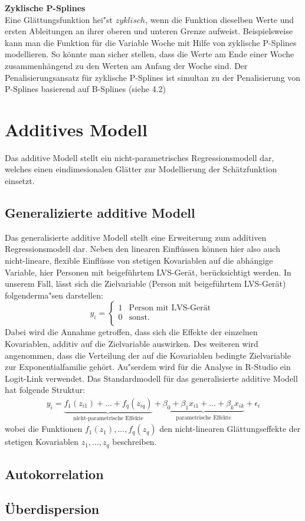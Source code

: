 \documentclass[12pt]{scrreprt}
\begin{document}
	\newpage
	\noindent\textbf{Zyklische P-Splines} \\
	Eine Glättungsfunktion hei"st $zyklisch$, wenn die Funktion dieselben Werte und ersten Ableitungen an ihrer oberen und unteren Grenze aufweist. Beispielsweise kann man die Funktion für die Variable Woche mit Hilfe von zyklische P-Splines modellieren. So könnte man sicher stellen, dass die Werte am Ende einer Woche zusammenhängend zu den Werten am Anfang der Woche sind. Der Penalisierungsansatz für zyklische P-Splines ist simultan zu der Penalisierung von P-Splines basierend auf B-Splines (siehe 4.2) 
	
	
	\section{Additives Modell}
	Das additive Modell stellt ein nicht-parametrisches Regressionsmodell dar, welches einen eindimesionalen Glätter zur Modellierung der Schätzfunktion einsetzt. 
	\subsection{Generalizierte additive Modell}
	Das generalisierte additive Modell stellt eine Erweiterung zum additiven Regressionsmodell dar.
	Neben den linearen Einﬂüssen können hier also auch nicht-lineare, flexible Einflüsse von stetigen Kovariablen auf die abhängige Variable, hier Personen mit beigeführtem LVS-Gerät, berücksichtigt werden. In unserem Fall, lässt sich die Zielvariable (Person mit beigeführtem LVS-Gerät) folgenderma"sen darstellen:
	\[y_{i}=\begin{cases}
	1 & \text{Person mit LVS-Gerät } \\
	0 & \text{sonst.} \\
	\end{cases}\]
	Dabei wird die Annahme getroffen, dass sich die Effekte der einzelnen Kovariablen, additiv auf die Zielvariable auswirken. Des weiteren wird angenommen, dass die Verteilung der auf die Kovariablen bedingte Zielvariable zur Exponentialfamilie gehört. Au"serdem wird für die Analyse in R-Studio ein Logit-Link verwendet.
	Das Standardmodell für das generalisierte additive Modell hat folgende Struktur: \\
	\begin{align} 
	y_{i}=\underbrace{f_{1}(z_{i1})+...+f_{q}(z_{iq})}_{\text{nicht-parametrische Effekte}}+\underbrace{\beta_{0}+\beta_{1}x_{i1}+...+\beta_{k}x_{ik}}_{\text{parametrische Effekte}}+\epsilon_{i}
	\end{align}
	wobei die Funktionen $f_{1}(z_{1}),...,f_{q}(z_{q})$ den nicht-linearen Glättungseffekte der stetigen  Kovariablen $z_{1},...,z_{q}$ beschreiben.
	
	\subsection{Autokorrelation} 
	
	\subsection{Überdispersion}
	
		
\end{document}
